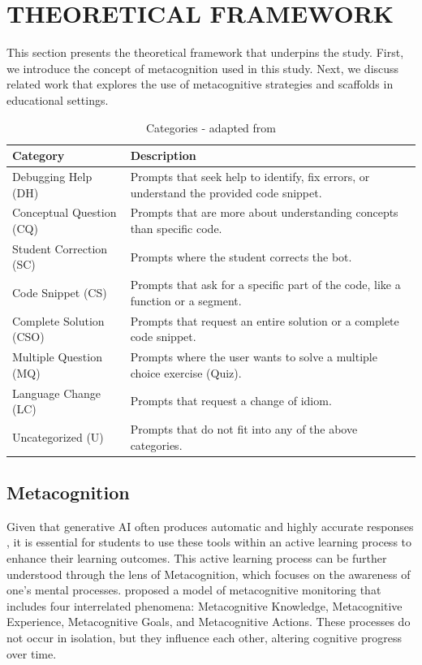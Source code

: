 \documentclass[a4paper,twoside]{article}
\begin{document}
\section{\uppercase{Theoretical Framework}}

This section presents the theoretical framework that underpins the study. First,
we introduce the concept of metacognition used in this study. Next, we discuss
related work that explores the use of metacognitive strategies and scaffolds
in educational settings.

\begin{table}[htbp]
  \caption{Categories - adapted from \cite{Ghimire24}}
  \begin{center}
    \renewcommand{\arraystretch}{1.6} %
    \begin{tabular}{p{4cm} p{12cm}} %
      \hline
      \textbf{Category} & \textbf{Description} \\
      \hline
      Debugging Help (DH) & Prompts that seek help to identify, fix errors, or understand the provided code snippet. \\
      Conceptual Question (CQ) & Prompts that are more about understanding concepts than specific code. \\
      Student Correction (SC) & Prompts where the student corrects the bot. \\
      Code Snippet  (CS) & Prompts that ask for a specific part of the code, like a function or a segment. \\
      Complete Solution (CSO) & Prompts that request an entire solution or a complete code snippet. \\
      Multiple Question (MQ) & Prompts where the user wants to solve a multiple choice exercise (Quiz). \\
      Language Change (LC) & Prompts that request a change of idiom. \\
      Uncategorized (U) & Prompts that do not fit into any of the above categories. \\
      \hline
    \end{tabular}
    \label{tab:categories}
  \end{center}
\end{table}

\subsection{Metacognition}

Given that generative AI often produces automatic and highly accurate responses
\citep{Puryear22}, it is essential for students to use these tools within an
active learning process to enhance their learning outcomes. This active
learning process can be further understood through the lens of Metacognition,
which focuses on the awareness of one’s mental processes. \cite{flavell79}
proposed a model of metacognitive monitoring that includes four interrelated
phenomena: Metacognitive Knowledge, Metacognitive Experience, Metacognitive
Goals, and Metacognitive Actions. These processes do not occur in isolation, but
they influence each other, altering cognitive progress over time.
\end{document}
